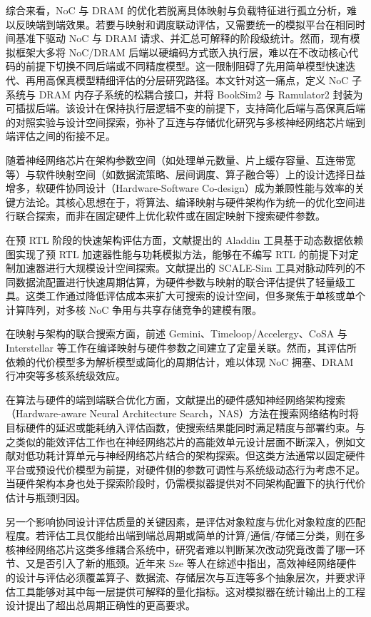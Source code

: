 综合来看，NoC 与 DRAM 的优化若脱离具体映射与负载特征进行孤立分析，难以反映端到端效果。若要与映射和调度联动评估，又需要统一的模拟平台在相同时间基准下驱动 NoC 与 DRAM 请求、并汇总可解释的阶段级统计。然而，现有模拟框架大多将 NoC/DRAM 后端以硬编码方式嵌入执行层，难以在不改动核心代码的前提下切换不同后端或不同精度模型。这一限制阻碍了先用简单模型快速迭代、再用高保真模型精细评估的分层研究路径。本文针对这一痛点，定义 NoC 子系统与 DRAM 内存子系统的松耦合接口，并将 BookSim2 与 Ramulator2 封装为可插拔后端。该设计在保持执行层逻辑不变的前提下，支持简化后端与高保真后端的对照实验与设计空间探索，弥补了互连与存储优化研究与多核神经网络芯片端到端评估之间的衔接不足。


随着神经网络芯片在架构参数空间（如处理单元数量、片上缓存容量、互连带宽等）与软件映射空间（如数据流策略、层间调度、算子融合等）上的设计选择日益增多，软硬件协同设计（Hardware-Software Co-design）成为兼顾性能与效率的关键方法论。其核心思想在于，将算法、编译映射与硬件架构作为统一的优化空间进行联合探索，而非在固定硬件上优化软件或在固定映射下搜索硬件参数。

在预 RTL 阶段的快速架构评估方面，文献\parencite{shao2014aladdin}提出的 Aladdin 工具基于动态数据依赖图实现了预 RTL 加速器性能与功耗模拟方法，能够在不编写 RTL 的前提下对定制加速器进行大规模设计空间探索。文献\parencite{samajdar2020scalesim}提出的 SCALE-Sim 工具对脉动阵列的不同数据流配置进行快速周期估算，为硬件参数与映射的联合评估提供了轻量级工具。这类工作通过降低评估成本来扩大可搜索的设计空间，但多聚焦于单核或单个计算阵列，对多核 NoC 争用与共享存储竞争的建模有限。

在映射与架构的联合搜索方面，前述 Gemini、Timeloop/Accelergy、CoSA 与 Interstellar 等工作在编译映射与硬件参数之间建立了定量关联。然而，其评估所依赖的代价模型多为解析模型或简化的周期估计，难以体现 NoC 拥塞、DRAM 行冲突等多核系统级效应。

在算法与硬件的端到端联合优化方面，文献\parencite{wu2019fbnet}提出的硬件感知神经网络架构搜索（Hardware-aware Neural Architecture Search，NAS）方法在搜索网络结构时将目标硬件的延迟或能耗纳入评估函数，使搜索结果能同时满足精度与部署约束。与之类似的能效评估工作也在神经网络芯片的高能效单元设计层面不断深入，例如文献\parencite{soma2024}对低功耗计算单元与神经网络芯片结合的架构探索。但这类方法通常以固定硬件平台或预设代价模型为前提，对硬件侧的参数可调性与系统级动态行为考虑不足。当硬件架构本身也处于探索阶段时，仍需模拟器提供对不同架构配置下的执行代价估计与瓶颈归因。

另一个影响协同设计评估质量的关键因素，是评估对象粒度与优化对象粒度的匹配程度。若评估工具仅能给出端到端总周期或简单的计算/通信/存储三分类，则在多核神经网络芯片这类多维耦合系统中，研究者难以判断某次改动究竟改善了哪一环节、又是否引入了新的瓶颈。近年来 Sze 等人在综述中指出\cite{sze2017efficient}，高效神经网络硬件的设计与评估必须覆盖算子、数据流、存储层次与互连等多个抽象层次，并要求评估工具能够对其中每一层提供可解释的量化指标。这对模拟器在统计输出上的工程设计提出了超出总周期正确性的更高要求。

